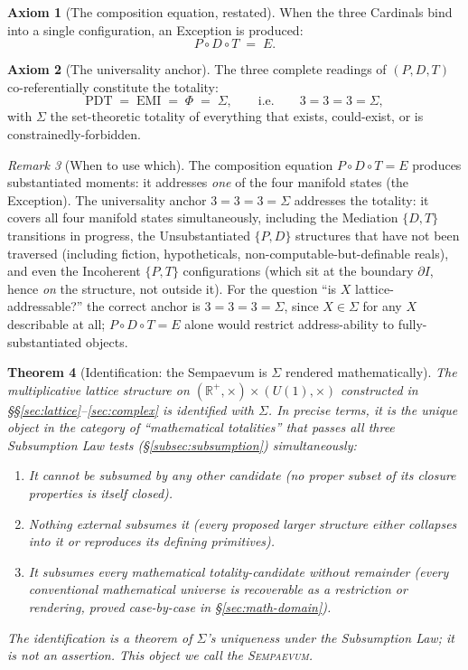 \documentclass[11pt,a4paper]{article}
\newtheorem{theorem}{Theorem}[section]
\theoremstyle{definition}
\newtheorem{axiom}[theorem]{Axiom}
\theoremstyle{remark}
\newtheorem{remark}[theorem]{Remark}
\newcommand{\R}{\mathbb{R}}
\newcommand{\Sempaevum}{\textsc{Sempaevum}}
\begin{document}
\begin{axiom}[The composition equation, restated]\label{ax:composition}
When the three Cardinals bind into a single configuration, an Exception is produced:
\[
P \circ D \circ T \;=\; E.
\]
\end{axiom}

\begin{axiom}[The universality anchor]\label{ax:anchor}
The three complete readings of $(P,D,T)$ co-referentially constitute the totality:
\[
\mathrm{PDT} \;=\; \mathrm{EMI} \;=\; \Phi \;=\; \Sigma, \qquad \text{i.e.} \qquad 3=3=3=\Sigma,
\]
with $\Sigma$ the set-theoretic totality of everything that exists, could-exist, or is constrainedly-forbidden.
\end{axiom}

\begin{remark}[When to use which]
The composition equation $P\circ D\circ T=E$ produces substantiated moments: it addresses \emph{one} of the four manifold states (the Exception). The universality anchor $3=3=3=\Sigma$ addresses the totality: it covers all four manifold states simultaneously, including the Mediation $\{D,T\}$ transitions in progress, the Unsubstantiated $\{P,D\}$ structures that have not been traversed (including fiction, hypotheticals, non-computable-but-definable reals), and even the Incoherent $\{P,T\}$ configurations (which sit at the boundary $\partial I$, hence \emph{on} the structure, not outside it). For the question ``is $X$ lattice-addressable?'' the correct anchor is $3=3=3=\Sigma$, since $X\in\Sigma$ for any $X$ describable at all; $P\circ D\circ T=E$ alone would restrict address-ability to fully-substantiated objects.
\end{remark}

\begin{theorem}[Identification: the Sempaevum is $\Sigma$ rendered mathematically]\label{thm:identification-Sigma}
The multiplicative lattice structure on $(\R^{+},\times)\times (U(1),\times)$ constructed in \S\S\ref{sec:lattice}--\ref{sec:complex} is identified with $\Sigma$. In precise terms, it is the unique object in the category of ``mathematical totalities'' that passes all three Subsumption Law tests (\S\ref{subsec:subsumption}) simultaneously:
\begin{enumerate}[label=(\roman*),leftmargin=*]
\item It cannot be subsumed by any other candidate (no proper subset of its closure properties is itself closed).
\item Nothing external subsumes it (every proposed larger structure either collapses into it or reproduces its defining primitives).
\item It subsumes every mathematical totality-candidate without remainder (every conventional mathematical universe is recoverable as a restriction or rendering, proved case-by-case in \S\ref{sec:math-domain}).
\end{enumerate}
The identification is a theorem of $\Sigma$'s uniqueness under the Subsumption Law; it is \emph{not} an assertion. This object we call the \Sempaevum.
\end{theorem}
\end{document}
